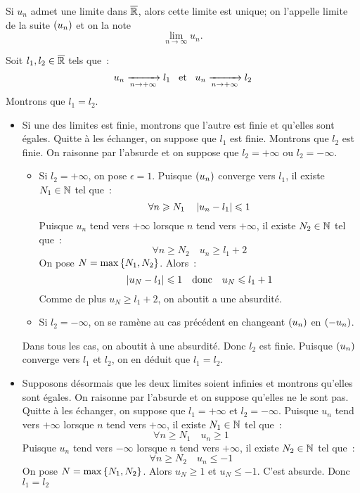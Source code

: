 \documentclass{magnolia}
\begin{document}
\begin{proposition}[utile=-3]
Si $u_n$ admet une limite dans $\overline{\mathbb{R}}$, alors cette limite est unique; on
l'appelle limite de la suite $\left(u_n\right)$ et on la note
\[\lim_{n\to\infty} u_n.\]
\end{proposition}

\begin{preuve}
Soit $l_1,l_2\in\overline{\mathbb{R}}$ tels que~:
\[u_n \xrightarrow[n\rightarrow +\infty]{} l_1 \quad\!\text{et}\quad\!
  u_n \xrightarrow[n\rightarrow +\infty]{} l_2\]
Montrons que $l_1=l_2$.
\begin{itemize}
\item Si une des limites est finie, montrons que l'autre est finie et qu'elles
  sont égales. Quitte à les échanger, on suppose que $l_1$ est finie. Montrons
  que $l_2$ est finie. On raisonne par l'absurde et on suppose que
  $l_2=+\infty$ ou $l_2=-\infty$.
  \begin{itemize}
  \item Si $l_2=+\infty$, on pose $\epsilon=1$. Puisque $\left(u_n\right)$ converge
    vers $l_1$, il existe $N_1\in\mathbb{N}$ tel que~:
    \[\forall n\geqslant N_1 \quad \left|u_n-l_1\right|\leqslant 1\]
    Puisque $u_n$ tend vers $+\infty$ lorsque $n$ tend vers $+\infty$, il
    existe $N_2\in\mathbb{N}$ tel que~:
    \[\forall n\geq N_2 \quad u_n \geq l_1+2\]
    On pose $N=\max\left\{N_1,N_2\right\}$. Alors~:
    \[\left|u_N-l_1\right|\leqslant 1 \quad\text{donc}\quad u_N \leqslant l_1+1\]
    Comme de plus $u_N\geq l_1+2$, on aboutit a une absurdité.
  \item Si $l_2=-\infty$, on se ramène au cas précédent en changeant $\left(u_n\right)$
    en $\left(-u_n\right)$.
  \end{itemize}
  Dans tous les cas, on aboutit à une absurdité. Donc $l_2$ est finie.
  Puisque $\left(u_n\right)$ converge vers $l_1$ et $l_2$, on en déduit que $l_1=l_2$.
\item Supposons désormais que les deux limites soient infinies et montrons
  qu'elles sont égales. On raisonne par l'absurde et on suppose qu'elles ne le
  sont pas. Quitte à les échanger, on suppose que $l_1=+\infty$ et
  $l_2=-\infty$. Puisque $u_n$ tend vers $+\infty$ lorsque $n$ tend vers
  $+\infty$, il existe $N_1\in\mathbb{N}$ tel que~:
  \[\forall n\geq N_1 \quad u_n \geq 1\]
  Puisque $u_n$ tend vers $-\infty$ lorsque $n$ tend vers $+\infty$, il existe
  $N_2\in\mathbb{N}$ tel que~:
  \[\forall n\geq N_2 \quad u_n \leq -1\]
  On pose $N=\max\left\{N_1,N_2\right\}$. Alors $u_N \geq 1$ et $u_N \leq -1$. C'est
  absurde. Donc $l_1=l_2$
\end{itemize}
\end{preuve}
\end{document}
